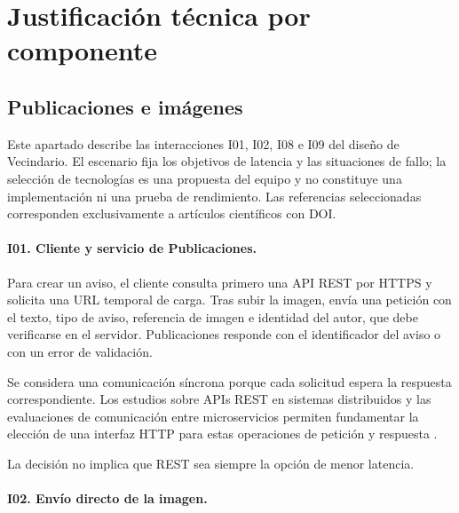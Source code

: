 \documentclass[12pt,a4paper]{article}
\begin{document}
\endgroup


\section{Justificación técnica por componente}


\subsection{Publicaciones e imágenes}

Este apartado describe las interacciones I01, I02, I08 e I09 del diseño de Vecindario. El escenario fija los objetivos de latencia y las situaciones de fallo; la selección de tecnologías es una propuesta del equipo y no constituye una implementación ni una prueba de rendimiento. Las referencias seleccionadas corresponden exclusivamente a artículos científicos con DOI.

\paragraph{I01. Cliente y servicio de Publicaciones.}

Para crear un aviso, el cliente consulta primero una API REST por HTTPS y solicita una URL temporal de carga. Tras subir la imagen, envía una petición con el texto, tipo de aviso, referencia de imagen e identidad del autor, que debe verificarse en el servidor. Publicaciones responde con el identificador del aviso o con un error de validación.

Se considera una comunicación síncrona porque cada solicitud espera la respuesta correspondiente. Los estudios sobre APIs REST en sistemas distribuidos y las evaluaciones de comunicación entre microservicios permiten fundamentar la elección de una interfaz HTTP para estas operaciones de petición y respuesta \cite{dimeglio2024rest,kazanavicius2023communication}.

La decisión no implica que REST sea siempre la opción de menor latencia.

\paragraph{I02. Envío directo de la imagen.}
\end{document}
